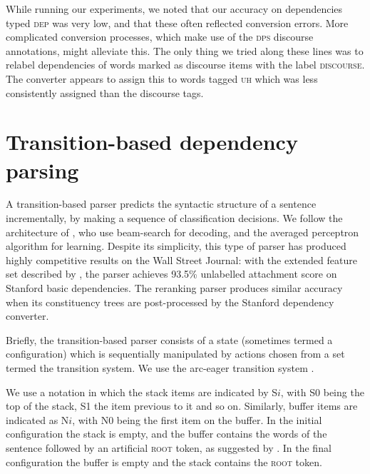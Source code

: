 \documentclass[11pt,letterpaper]{article}
\begin{document}
While running our experiments, we noted that our accuracy on dependencies
typed \textsc{dep} was very low, and that these often reflected conversion errors.
More complicated conversion processes, which make use of the \textsc{dps} discourse
annotations, might alleviate this. The only thing we tried along these lines was
to relabel dependencies of words marked as discourse items with the label
\textsc{discourse}. The converter appears to assign this to words tagged \textsc{uh}
which was less consistently assigned than the discourse tags.

\section{Transition-based dependency parsing}

A transition-based parser predicts the syntactic structure of a sentence incrementally,
by making a sequence of classification decisions.  We follow the architecture of
\citet{zhang:cl11}, who use beam-search for decoding, and the averaged
perceptron algorithm for learning.  Despite its simplicity, this type of parser
has produced highly competitive results on the Wall Street Journal: with the
extended feature set described by \citet{zhang:11}, the parser achieves 93.5\%
unlabelled attachment score on Stanford basic dependencies.  The \citet{Charniak05a}
reranking parser produces similar accuracy when its constituency trees are post-processed
by the Stanford dependency converter.

Briefly, the transition-based parser consists of a state (sometimes termed a
configuration) which is sequentially manipulated by actions chosen from a set
termed the transition system. We use the arc-eager transition system
\citep{nivre:03,nivre:cl}.

We use a notation in which the stack items are indicated by S$i$, with S0 being
the top of the stack, S1 the item previous to it and so on. Similarly, buffer
items are indicated as N$i$, with N0 being the first item on the buffer.
In the initial configuration the stack is empty, and the buffer contains the words
of the sentence followed by an artificial \textsc{root} token, as suggested by
\citet{nivre:squib}.
In the final configuration the buffer is empty and the stack contains the 
\textsc{root} token.
\end{document}
